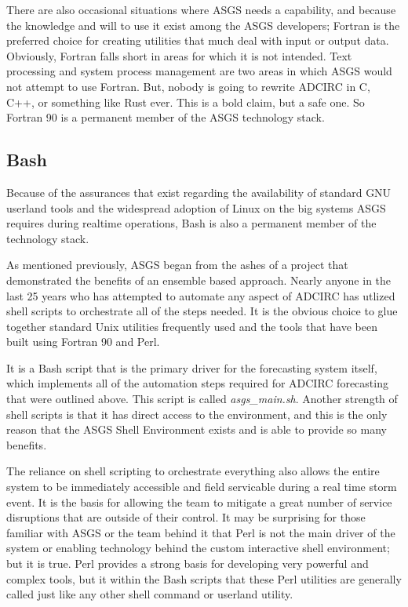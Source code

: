 \documentclass{article}
\begin{document}
There are also occasional situations where ASGS needs a capability, and because
the knowledge and will to use it exist among the ASGS developers; Fortran is the
preferred choice for creating utilities that much deal with input or output
data. Obviously, Fortran falls short in areas for which it is not intended. Text
processing and system process management are two areas in which ASGS would not
attempt to use Fortran. But, nobody is going to rewrite ADCIRC in C, C++, or
something like Rust ever. This is a bold claim, but a safe one. So Fortran 90 is
a permanent member of the ASGS technology stack.

\subsection{Bash}

Because of the assurances that exist regarding the availability of standard GNU
userland tools and the widespread adoption of Linux on the big systems ASGS
requires during realtime operations, Bash is also a permanent member of the
technology stack.

As mentioned previously, ASGS began from the ashes of a project that
demonstrated the benefits of an ensemble based approach. Nearly anyone in the
last 25 years who has attempted to automate any aspect of ADCIRC has utlized
shell scripts to orchestrate all of the steps needed. It is the obvious choice
to glue together standard Unix utilities frequently used and the tools that have
been built using Fortran 90 and Perl.

It is a Bash script that is the primary driver for the forecasting system
itself, which implements all of the automation steps required for ADCIRC
forecasting that were outlined above. This script is called \textit{asgs\_main.sh}.
Another strength of shell scripts is that it has direct access to the
environment, and this is the only reason that the ASGS Shell Environment exists
and is able to provide so many benefits.

The reliance on shell scripting to orchestrate everything also allows the entire
system to be immediately accessible and field servicable during a real time
storm event. It is the basis for allowing the team to mitigate a great number of
service disruptions that are outside of their control. It may be surprising for
those familiar with ASGS or the team behind it that Perl is not the main driver
of the system or enabling technology behind the custom interactive shell
environment; but it is true. Perl provides a strong basis for developing very
powerful and complex tools, but it within the Bash scripts that these Perl
utilities are generally called just like any other shell command or userland
utility.
\end{document}
